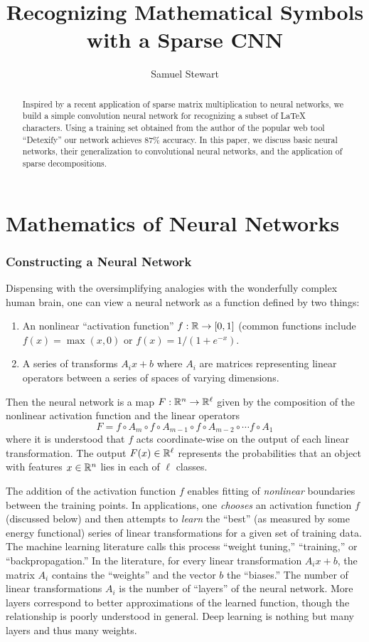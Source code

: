 \documentclass[12pt,letterpaper,boxed]{article}
\author{Samuel Stewart}
\title{Recognizing Mathematical Symbols with a Sparse CNN}
\begin{document}
\maketitle

\begin{abstract}
Inspired by a recent application of sparse matrix multiplication \cite{bao2015} to neural networks,  we build a simple convolution neural network for recognizing a subset of LaTeX characters. Using a training set obtained from the author of the popular web tool ``Detexify'' \cite{detexify} our network achieves $87\%$ accuracy. In this paper, we discuss basic neural networks, their generalization to convolutional neural networks, and the application of sparse decompositions.
\end{abstract}

\section{Mathematics of Neural Networks}

	\subsubsection{Constructing a Neural Network}
	Dispensing with the oversimplifying analogies with the wonderfully complex human brain, one can view a neural network as a function defined by two things:
	\begin{enumerate}
		\item An nonlinear ``activation function'' $f : {\mathbb{R}} \to [0, 1]$ (common functions include $f(x) = \max(x, 0)$ or $f(x) = 1 / (1 + e^{-x})$.
		\item A series of transforms $A_i x + b$ where $A_i$ are matrices representing linear operators between a series of spaces of varying dimensions.
	\end{enumerate}
	Then the neural network is a map $F : {\mathbb{R}}^n \to {\mathbb{R}}^\ell$ given by the composition of the nonlinear activation function and the linear operators
	\[
		F = f  \circ A_m \circ f \circ A_{m - 1} \circ f \circ A_{m - 2} \circ \cdots f \circ A_1
	\]
	where it is understood that $f$ acts coordinate-wise on the output of each linear transformation. The output $F(x) \in {\mathbb{R}}^\ell$ represents the probabilities that an object with features $x \in {\mathbb{R}}^n$ lies in each of $\ell$ classes.
	
	The addition of the activation function $f$ enables fitting of \textit{nonlinear} boundaries between the training points. In applications, one \textit{chooses} an activation function $f$ (discussed below) and then attempts to \textit{learn} the ``best'' (as measured by some energy functional) series of linear transformations for a given set of training data. The machine learning literature calls this process ``weight tuning,'' ``training,'' or ``backpropagation.'' In the literature, for every linear transformation $A_i x + b$, the matrix $A_i$ contains the ``weights'' and the vector $b$ the ``biases.'' The number of linear transformations $A_i$ is the number of ``layers'' of the neural network. More layers correspond to better approximations of the learned function, though the relationship is poorly understood in general. Deep learning is nothing but many layers and thus many weights.
	
\end{document}
